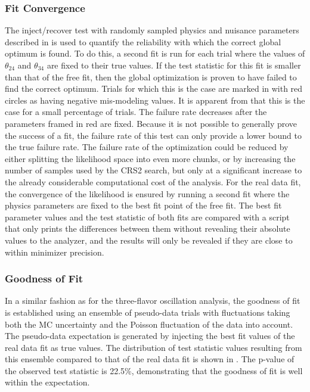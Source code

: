 
\subsubsection{Fit Convergence}

The inject/recover test with randomly sampled physics and nuisance parameters described in  is used to quantify the reliability with which the correct global optimum is found.
To do this, a second fit is run for each trial where the values of $\theta_{24}$ and $\theta_{34}$ are fixed to their true values.
If the test statistic for this fit is smaller than that of the free fit, then the global optimization is proven to have failed to find the correct optimum.
Trials for which this is the case are marked in  with red circles as having negative mis-modeling values.
It is apparent from  that this is the case for a small percentage of trials.
The failure rate decreases after the parameters framed in red are fixed.
Because it is not possible to generally prove the success of a fit, the failure rate of this test can only provide a lower bound to the true failure rate.
The failure rate of the optimization could be reduced by either splitting the likelihood space into even more chunks, or by increasing the number of samples used by the \textsc{CRS2} search, but only at a significant increase to the already considerable computational cost of the analysis.
For the real data fit, the convergence of the likelihood is ensured by running a second fit where the physics parameters are fixed to the best fit point of the free fit.
The best fit parameter values and the test statistic of both fits are compared with a script that only prints the differences between them without revealing their absolute values to the analyzer, and the results will only be revealed if they are close to within minimizer precision.

\subsubsection{Goodness of Fit}
In a similar fashion as for the three-flavor oscillation analysis, the goodness of fit is established using an ensemble of pseudo-data trials with fluctuations taking both the MC uncertainty and the Poisson fluctuation of the data into account.
The pseudo-data expectation is generated by injecting the best fit values of the real data fit as true values.
The distribution of test statistic values resulting from this ensemble compared to that of the real data fit is shown in .
The p-value of the observed test statistic is 22.5\%, demonstrating that the goodness of fit is well within the expectation.


